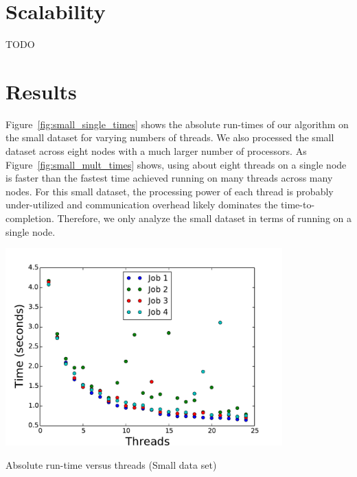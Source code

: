 \documentclass{article}
\begin{document}
\section{Scalability}
TODO

\section{Results}

Figure~\ref{fig:small_single_times} shows the absolute run-times of our algorithm on the small dataset for varying numbers of threads. We also processed the small dataset across eight nodes with a much larger number of processors. As Figure~\ref{fig:small_mult_times} shows, using about eight threads on a single node is faster than the fastest time achieved running on many threads across many nodes. For this small dataset, the processing power of each thread is probably under-utilized and communication overhead likely dominates the time-to-completion. Therefore, we only analyze the small dataset in terms of running on a single node.

\begin{minipage}{\linewidth}
  \captionsetup{type=figure}
  \begin{center}
  \includegraphics[width=0.8\textwidth]{SingleTime.pdf}
  \end{center}
  \caption{Absolute run-time versus threads (Small data set)} \label{fig:small_single_times}
\end{minipage}
\end{document}
